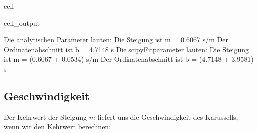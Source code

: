 \documentclass[letterpaper,10pt,english]{jupyterBook}
\begin{document}
\begin{sphinxuseclass}{cell}
\begin{sphinxVerbatimOutput}
\begin{sphinxuseclass}{cell_output}
\begin{sphinxVerbatim}[commandchars=\\\{\}]
Die analytischen Parameter lauten:
Die Steigung ist 		 m = 0.6067 s/m
Der Ordinatenabschnitt ist 	 b = 4.7148 s
Die scipy\PYGZhy{}Fitparameter lauten:
Die Steigung ist 		 m = (0.6067 +\PYGZhy{} 0.0534) s/m
Der Ordinatenabschnitt ist 	 b = (4.7148 +\PYGZhy{} 3.9581) s
\end{sphinxVerbatim}

\noindent{}

\end{sphinxuseclass}\end{sphinxVerbatimOutput}

\end{sphinxuseclass}

\subsection{Geschwindigkeit}
\label{\detokenize{content/T_Fehlerfortpflanzung:geschwindigkeit}}
\sphinxAtStartPar
Der Kehrwert der Steigung \(m\) liefert uns die Geschwindigkeit des Karussells, wenn wir den Kehrwert berechnen:
\end{document}
